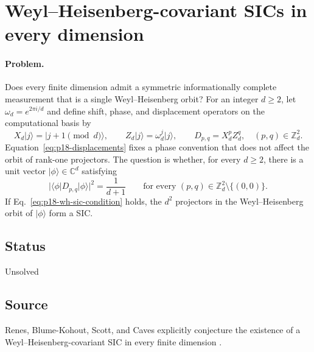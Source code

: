 \section{Weyl--Heisenberg-covariant SICs in every dimension}
\label{sec:op_6ba929179cc40c0a}

\paragraph{Problem.}
Does every finite dimension admit a symmetric informationally complete
measurement that is a single Weyl--Heisenberg orbit?  For an integer $d\geq2$,
let $\omega_d=e^{2\pi i/d}$ and define shift, phase, and displacement operators
on the computational basis by
\begin{equation}
  X_d\lvert j\rangle=\lvert j+1\!\!\pmod d\rangle,
  \qquad
  Z_d\lvert j\rangle=\omega_d^j\lvert j\rangle,
  \qquad
  D_{p,q}=X_d^pZ_d^q,
  \quad (p,q)\in\mathbb Z_d^2.
  \label{eq:p18-displacements}
\end{equation}
Equation~\eqref{eq:p18-displacements} fixes a phase convention that does not
affect the orbit of rank-one projectors.  The question is whether, for every
$d\geq2$, there is a unit vector $\lvert\phi\rangle\in\mathbb C^d$ satisfying
\begin{equation}
  \bigl|\langle\phi\rvert D_{p,q}\lvert\phi\rangle\bigr|^2
  =\frac{1}{d+1}
  \qquad
  \text{for every }(p,q)\in\mathbb Z_d^2\setminus\{(0,0)\}.
  \label{eq:p18-wh-sic-condition}
\end{equation}
If Eq.~\eqref{eq:p18-wh-sic-condition} holds, the $d^2$ projectors in the
Weyl--Heisenberg orbit of $\lvert\phi\rangle$ form a SIC.

\subsection*{Status}

Unsolved

\subsection*{Source}

Renes, Blume-Kohout, Scott, and Caves explicitly conjecture the existence of a
Weyl--Heisenberg-covariant SIC in every finite dimension
.

